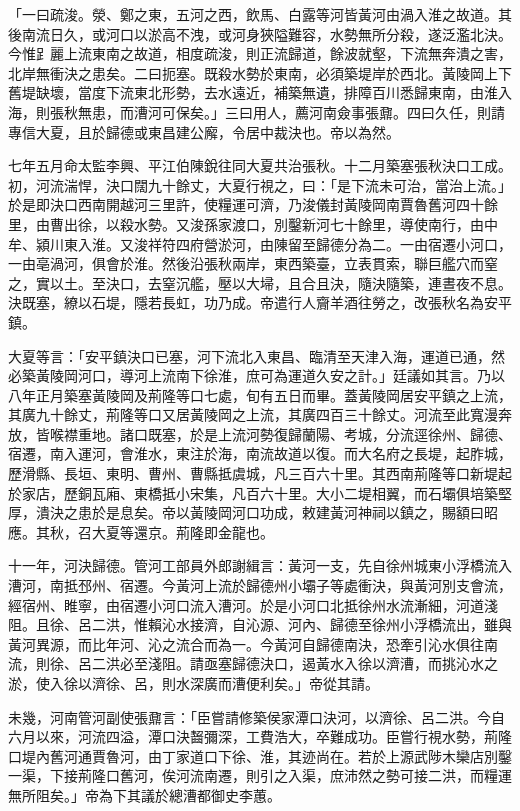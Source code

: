 「一曰疏浚。滎、鄭之東，五河之西，飲馬、白露等河皆黃河由渦入淮之故道。其後南流日久，或河口以淤高不洩，或河身狹隘難容，水勢無所分殺，遂泛濫北決。今惟𧾷麗上流東南之故道，相度疏浚，則正流歸道，餘波就壑，下流無奔潰之害，北岸無衝決之患矣。二曰扼塞。既殺水勢於東南，必須築堤岸於西北。黃陵岡上下舊堤缺壞，當度下流東北形勢，去水遠近，補築無遺，排障百川悉歸東南，由淮入海，則張秋無患，而漕河可保矣。」三曰用人，薦河南僉事張鼐。四曰久任，則請專信大夏，且於歸德或東昌建公廨，令居中裁決也。帝以為然。

七年五月命太監李興、平江伯陳銳往同大夏共治張秋。十二月築塞張秋決口工成。初，河流湍悍，決口闊九十餘丈，大夏行視之，曰：「是下流未可治，當治上流。」於是即決口西南開越河三里許，使糧運可濟，乃浚儀封黃陵岡南賈魯舊河四十餘里，由曹出徐，以殺水勢。又浚孫家渡口，別鑿新河七十餘里，導使南行，由中牟、潁川東入淮。又浚祥符四府營淤河，由陳留至歸德分為二。一由宿遷小河口，一由亳渦河，俱會於淮。然後沿張秋兩岸，東西築臺，立表貫索，聯巨艦穴而窒之，實以土。至決口，去窒沉艦，壓以大埽，且合且決，隨決隨築，連晝夜不息。決既塞，繚以石堤，隱若長虹，功乃成。帝遣行人齎羊酒往勞之，改張秋名為安平鎮。

大夏等言：「安平鎮決口已塞，河下流北入東昌、臨清至天津入海，運道已通，然必築黃陵岡河口，導河上流南下徐淮，庶可為運道久安之計。」廷議如其言。乃以八年正月築塞黃陵岡及荊隆等口七處，旬有五日而畢。蓋黃陵岡居安平鎮之上流，其廣九十餘丈，荊隆等口又居黃陵岡之上流，其廣四百三十餘丈。河流至此寬漫奔放，皆喉襟重地。諸口既塞，於是上流河勢復歸蘭陽、考城，分流逕徐州、歸德、宿遷，南入運河，會淮水，東注於海，南流故道以復。而大名府之長堤，起胙城，歷滑縣、長垣、東明、曹州、曹縣抵虞城，凡三百六十里。其西南荊隆等口新堤起於家店，歷銅瓦廂、東橋抵小宋集，凡百六十里。大小二堤相翼，而石壩俱培築堅厚，潰決之患於是息矣。帝以黃陵岡河口功成，敕建黃河神祠以鎮之，賜額曰昭應。其秋，召大夏等還京。荊隆即金龍也。

十一年，河決歸德。管河工部員外郎謝緝言：黃河一支，先自徐州城東小浮橋流入漕河，南抵邳州、宿遷。今黃河上流於歸德州小壩子等處衝決，與黃河別支會流，經宿州、睢寧，由宿遷小河口流入漕河。於是小河口北抵徐州水流漸細，河道淺阻。且徐、呂二洪，惟賴沁水接濟，自沁源、河內、歸德至徐州小浮橋流出，雖與黃河異源，而比年河、沁之流合而為一。今黃河自歸德南決，恐牽引沁水俱往南流，則徐、呂二洪必至淺阻。請亟塞歸德決口，遏黃水入徐以濟漕，而挑沁水之淤，使入徐以濟徐、呂，則水深廣而漕便利矣。」帝從其請。

未幾，河南管河副使張鼐言：「臣嘗請修築侯家潭口決河，以濟徐、呂二洪。今自六月以來，河流四溢，潭口決齧彌深，工費浩大，卒難成功。臣嘗行視水勢，荊隆口堤內舊河通賈魯河，由丁家道口下徐、淮，其迹尚在。若於上源武陟木欒店別鑿一渠，下接荊隆口舊河，俟河流南遷，則引之入渠，庶沛然之勢可接二洪，而糧運無所阻矣。」帝為下其議於總漕都御史李蕙。

